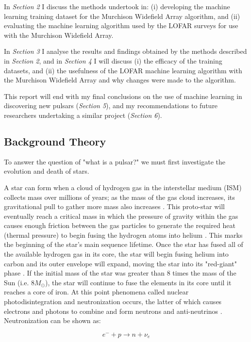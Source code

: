 \documentclass{article}
\begin{document}
In \emph{Section 2} I discuss the methods undertook in: (i) developing the machine learning training dataset for the Murchison Widefield Array algorithm, and (ii) evaluating the machine learning algorithm used by the LOFAR surveys for use with the Murchison Widefield Array.

In \emph{Section 3} I analyse the results and findings obtained by the methods described in \emph{Section 2}, and in \emph{Section 4} I will discuss (i) the efficacy of the training datasets, and (ii) the usefulness of the LOFAR machine learning algorithm with the Murchison Widefield Array and why changes were made to the algorithm.

This report will end with my final conclusions on the use of machine learning in discovering new pulsars (\emph{Section 5}), and my recommendations to future researchers undertaking a similar project (\emph{Section 6}).

\subsection{Background Theory}

To answer the question of "what is a pulsar?" we must first investigate the evolution and death of stars.

A star can form when a cloud of hydrogen gas in the interstellar medium (ISM) collects mass over millions of years; as the mass of the gas cloud increases, its gravitational pull to gather more mass also increases \autocite{maoz}. This proto-star will eventually reach a critical mass in which the pressure of gravity within the gas causes enough friction between the gas particles to generate the required heat (thermal pressure) to begin fusing the hydrogen atoms into helium \autocite{maoz}. This marks the beginning of the star's main sequence lifetime. Once the star has fused all of the available hydrogen gas in its core, the star will begin fusing helium into carbon and its outer envelope will expand, moving the star into its "red-giant" phase \autocite{maoz}. If the initial mass of the star was greater than 8 times the mass of the Sun (i.e. $8M_{\odot}$), the star will continue to fuse the elements in its core until it reaches a core of iron. At this point phenomena called nuclear photodisintegration and neutronization occurs, the latter of which causes electrons and photons to combine and form neutrons and anti-neutrinos \autocite{maoz}. Neutronization can be shown as:

$$ e^{-}+p\rightarrow n + \nu_e$$
\end{document}
